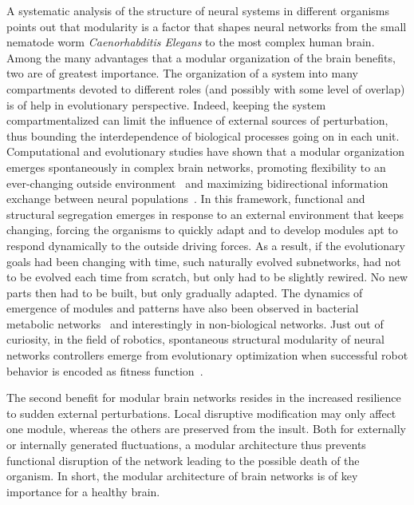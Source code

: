 \lettrine{A}{} systematic analysis of the structure of neural systems in different organisms points out that modularity is a factor that shapes neural networks from the small nematode worm \emph{Caenorhabditis Elegans} to the most complex human brain.
Among the many advantages that a modular organization of the brain benefits, two are of greatest importance. The organization of a system into many compartments devoted to different roles (and possibly with some level of overlap) is of help in evolutionary perspective.
Indeed, keeping the system compartmentalized can limit the influence of external sources of perturbation, thus bounding the interdependence of biological processes going on in each unit.
Computational and evolutionary studies have shown that a modular organization emerges spontaneously in complex brain networks, promoting flexibility to an ever-changing outside environment~\cite{kashtan2005,kashtan2007} and maximizing bidirectional information exchange between neural populations~\cite{yamaguti2015}.
In this framework, functional and structural segregation emerges in response to an external environment that keeps changing, forcing the organisms to quickly adapt and to develop modules apt to respond dynamically to the outside driving forces.
As a result, if the evolutionary goals had been changing with time, such naturally evolved subnetworks, had not to be evolved each time from scratch, but only had to be slightly rewired. No new parts then had to be built, but only gradually adapted.
The dynamics of emergence of modules and patterns have also been observed in bacterial metabolic networks~\cite{kreimer2008} and interestingly in non-biological networks. Just out of curiosity, in the field of robotics, spontaneous structural modularity of neural networks controllers emerge from evolutionary optimization when successful robot behavior is encoded as fitness function~\cite{bongard2011}.

The second benefit for modular brain networks resides in the increased resilience to sudden external perturbations.
Local disruptive modification may only affect one module, whereas the others are preserved from the insult. Both for externally or internally generated fluctuations, a modular architecture thus prevents functional disruption of the network leading to the possible death of the organism.
In short, the modular architecture of brain networks is of key importance for a healthy brain.

